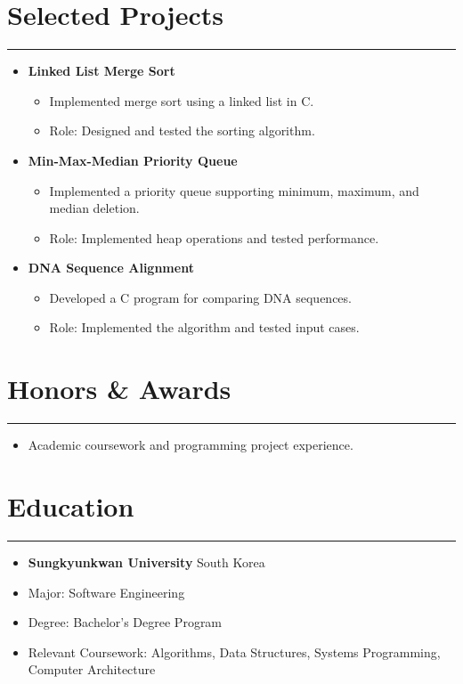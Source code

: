 \documentclass[letterpaper,10pt]{article}
\begin{document}
\section*{Selected Projects}
\hrule
\vspace{4pt}
\begin{itemize}
    \item \textbf{Linked List Merge Sort}
    \begin{itemize}
        \item Implemented merge sort using a linked list in C.
        \item Role: Designed and tested the sorting algorithm.
    \end{itemize}

    \item \textbf{Min-Max-Median Priority Queue}
    \begin{itemize}
        \item Implemented a priority queue supporting minimum, maximum, and median deletion.
        \item Role: Implemented heap operations and tested performance.
    \end{itemize}

    \item \textbf{DNA Sequence Alignment}
    \begin{itemize}
        \item Developed a C program for comparing DNA sequences.
        \item Role: Implemented the algorithm and tested input cases.
    \end{itemize}
\end{itemize}

\section*{Honors \& Awards}
\hrule
\vspace{4pt}
\begin{itemize}
    \item Academic coursework and programming project experience.
\end{itemize}

\section*{Education}
\hrule
\vspace{4pt}
\begin{itemize}
    \item \textbf{Sungkyunkwan University} \hfill South Korea
    \item Major: Software Engineering
    \item Degree: Bachelor's Degree Program
    \item Relevant Coursework: Algorithms, Data Structures, Systems Programming, Computer Architecture
\end{itemize}
\end{document}
